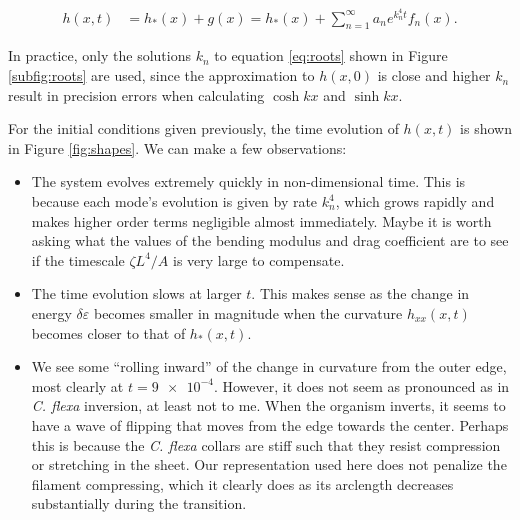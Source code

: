 \begin{align}
    h(x, t) &= h_*(x) + g(x) = h_*(x) + \sum_{n=1}^\infty a_n e^{k_n^4 t} f_n(x). \label{eq:sol}
\end{align}

\noindent In practice, only the solutions $k_n$ to equation \ref{eq:roots} shown in Figure \ref{subfig:roots} are used, since the approximation to $h(x, 0)$ is close and higher $k_n$ result in precision errors when calculating $\cosh kx$ and $\sinh kx$. 

For the initial conditions given previously, the time evolution of $h(x, t)$ is shown in Figure \ref{fig:shapes}. We can make a few observations:

\begin{itemize}
    \item The system evolves extremely quickly in non-dimensional time. This is because each mode's evolution is given by rate $k_n^4$, which grows rapidly and makes higher order terms negligible almost immediately. Maybe it is worth asking what the values of the bending modulus and drag coefficient are to see if the timescale $\zeta L^4 / A$ is very large to compensate.
    \item The time evolution slows at larger $t$. This makes sense as the change in energy $\delta \varepsilon$ becomes smaller in magnitude when the curvature $h_{xx}(x, t)$ becomes closer to that of $h_*(x, t)$.
    \item We see some ``rolling inward'' of the change in curvature from the outer edge, most clearly at $t = \num{9e-4}$. However, it does not seem as pronounced as in \textit{C. flexa} inversion, at least not to me. When the organism inverts, it seems to have a wave of flipping that moves from the edge towards the center. Perhaps this is because the \textit{C. flexa} collars are stiff such that they resist compression or stretching in the sheet. Our representation used here does not penalize the filament compressing, which it clearly does as its arclength decreases substantially during the transition. 
\end{itemize}

